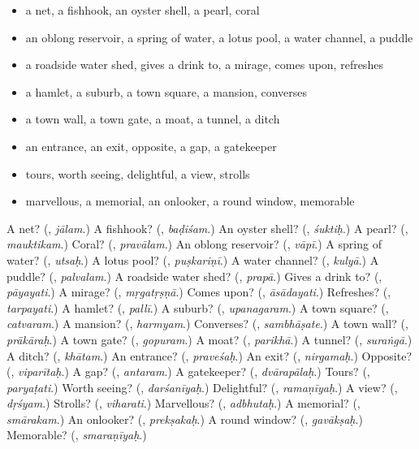 \begin{itemize}
\raggedright
  \item a net, a fishhook, an oyster shell, a pearl, coral
  \item an oblong reservoir, a spring of water, a lotus pool, a water channel, a puddle
  \item a roadside water shed, gives a drink to, a mirage, comes upon, refreshes
  \item a hamlet, a suburb, a town square, a mansion, converses
  \item a town wall, a town gate, a moat, a tunnel, a ditch
  \item an entrance, an exit, opposite, a gap, a gatekeeper
  \item tours, worth seeing, delightful, a view, strolls
  \item marvellous, a memorial, an onlooker, a round window, memorable
\end{itemize}

\begin{tcolorbox}[breakable,colback=teal!4,colframe=teal!35!black,title={Before you move on}]
A net? (\textbf{}, \emph{jālam}.) A fishhook? (\textbf{}, \emph{baḍiśam}.) An oyster shell? (\textbf{}, \emph{śuktiḥ}.) A pearl? (\textbf{}, \emph{mauktikam}.) Coral? (\textbf{}, \emph{pravālam}.) An oblong reservoir? (\textbf{}, \emph{vāpī}.) A spring of water? (\textbf{}, \emph{utsaḥ}.) A lotus pool? (\textbf{}, \emph{puṣkariṇī}.) A water channel? (\textbf{}, \emph{kulyā}.) A puddle? (\textbf{}, \emph{palvalam}.) A roadside water shed? (\textbf{}, \emph{prapā}.) Gives a drink to? (\textbf{}, \emph{pāyayati}.) A mirage? (\textbf{}, \emph{mṛgatṛṣṇā}.) Comes upon? (\textbf{}, \emph{āsādayati}.) Refreshes? (\textbf{}, \emph{tarpayati}.) A hamlet? (\textbf{}, \emph{pallī}.) A suburb? (\textbf{}, \emph{upanagaram}.) A town square? (\textbf{}, \emph{catvaram}.) A mansion? (\textbf{}, \emph{harmyam}.) Converses? (\textbf{}, \emph{sambhāṣate}.) A town wall? (\textbf{}, \emph{prākāraḥ}.) A town gate? (\textbf{}, \emph{gopuram}.) A moat? (\textbf{}, \emph{parikhā}.) A tunnel? (\textbf{}, \emph{suraṅgā}.) A ditch? (\textbf{}, \emph{khātam}.) An entrance? (\textbf{}, \emph{praveśaḥ}.) An exit? (\textbf{}, \emph{nirgamaḥ}.) Opposite? (\textbf{}, \emph{viparītaḥ}.) A gap? (\textbf{}, \emph{antaram}.) A gatekeeper? (\textbf{}, \emph{dvārapālaḥ}.) Tours? (\textbf{}, \emph{paryaṭati}.) Worth seeing? (\textbf{}, \emph{darśanīyaḥ}.) Delightful? (\textbf{}, \emph{ramaṇīyaḥ}.) A view? (\textbf{}, \emph{dṛśyam}.) Strolls? (\textbf{}, \emph{viharati}.) Marvellous? (\textbf{}, \emph{adbhutaḥ}.) A memorial? (\textbf{}, \emph{smārakam}.) An onlooker? (\textbf{}, \emph{prekṣakaḥ}.) A round window? (\textbf{}, \emph{gavākṣaḥ}.) Memorable? (\textbf{}, \emph{smaraṇīyaḥ}.)
\end{tcolorbox}
